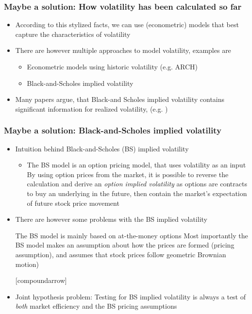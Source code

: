 \documentclass[aspectratio=169]{beamer}
\begin{document}
\begin{frame}
\frametitle{Maybe a solution: How volatility has been calculated so far}
	\begin{itemize}
	\item According to this stylized facts, we can use (econometric) models that best capture the characteristics of volatility
	\item There are however multiple approaches to model volatility, examples are
		\begin{itemize}
		\item Econometric models using historic volatility (e.g. ARCH)
		\item Black-and-Scholes implied volatility
		\end{itemize}
	\item Many papers argue, that Black-and Scholes implied volatility contains significant information for realized volatility, (e.g. \textcite{jiang2005})
	\end{itemize}
\end{frame}

\begin{frame}
\frametitle{Maybe a solution: Black-and-Scholes implied volatility}
%
	\begin{itemize}
	\item Intuition behind Black-and-Scholes (BS) implied volatility
		\begin{itemize}
		\item The BS model is an option pricing model, that uses volatility as an input
		\pro By using option prices from the market, it is possible to reverse the calculation and derive an \textit{option implied volatility}
		\pro as options are contracts to buy an underlying in the future, then contain the market's expectation of future stock price movement 
		\end{itemize}
	\item There are however some problems with the BS implied volatility
		\begin{itemize}
		\con The BS model is mainly based on at-the-money options 
		\con Most importantly the BS model makes an assumption about how the prices are formed (pricing assumption), and assumes that stock prices follow geometric Brownian motion)
		\end{itemize}
[compoundarrow]
	\item Joint hypothesis problem: Testing for BS implied volatility is always a test of \textit{both} market efficiency and the BS pricing assumptions
	\end{itemize}
\end{frame}
\end{document}
